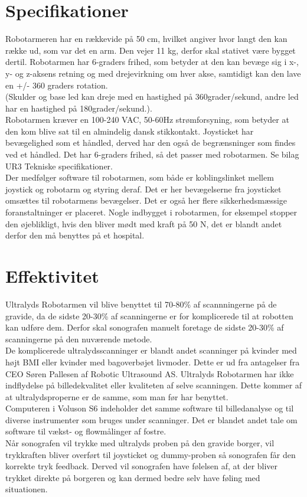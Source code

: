 \section{Specifikationer}
Robotarmeren har en rækkevide på 50 cm, hvilket angiver hvor langt den kan række ud, som var det en arm. Den vejer 11 kg, derfor skal stativet være bygget dertil. Robotarmen har 6-graders frihed, som betyder at den kan bevæge sig i x-, y- og z-aksens retning og med drejevirkning om hver akse, samtidigt kan den lave en +/- 360 graders rotation. \\
(Skulder og base led kan dreje med en hastighed på 360grader/sekund,  andre led har en hastighed på 180grader/sekund.). \\
Robotarmen kræver en 100-240 VAC, 50-60Hz strømforsyning, som betyder at den kom blive sat til en almindelig dansk stikkontakt. 
\newline 
Joysticket har bevægelighed som et håndled, derved har den også de begrænsninger som findes ved et håndled. Det har 6-graders frihed, så det passer med robotarmen. Se bilag UR3 Tekniske specifikationer. \\

Der medfølger software til robotarmen, som både er koblingslinket mellem joystick og robotarm og styring deraf. Det er her bevægelserne fra joysticket omsættes til robotarmens bevægelser. Det er også her flere sikkerhedsmæssige foranstaltninger er placeret. Nogle indbygget i robotarmen, for eksempel stopper den øjeblikligt, hvis den bliver mødt med kraft på 50 N, det er blandt andet derfor den må benyttes på et hospital.    

\section{Effektivitet}
Ultralyds Robotarmen vil blive benyttet til 70-80\% af scannningerne på de gravide, da de sidste 20-30\% af scanningerne er for komplicerede til at robotten kan udføre dem. Derfor skal sonografen manuelt foretage de sidste 20-30\% af scanningerne på den nuværende metode. \\ 
De komplicerede ultralydsscanninger er blandt andet scanninger på kvinder med højt BMI eller kvinder med bagoverbøjet livmoder. Dette er ud fra antagelser fra CEO Søren Pallesen af Robotic Ultrasound AS. 
\newline 
Ultralyds Robotarmen har ikke indflydelse på billedekvalitet eller kvaliteten af selve scanningen. Dette kommer af at ultralydsproperne er de samme, som man før har benyttet. \\Computeren i Voluson S6 indeholder det samme software til billedanalyse og til diverse instrumenter som bruges under scanninger. Det er blandet andet tale om software til vækst- og flowmålinger af fostre.   \\
Når sonografen vil trykke med ultralyds proben på den gravide borger, vil trykkraften bliver overført til joysticket og dummy-proben så sonografen får den korrekte tryk feedback. Derved vil sonografen have følelsen af, at der bliver trykket direkte på borgeren og kan dermed bedre selv have føling med situationen. 
